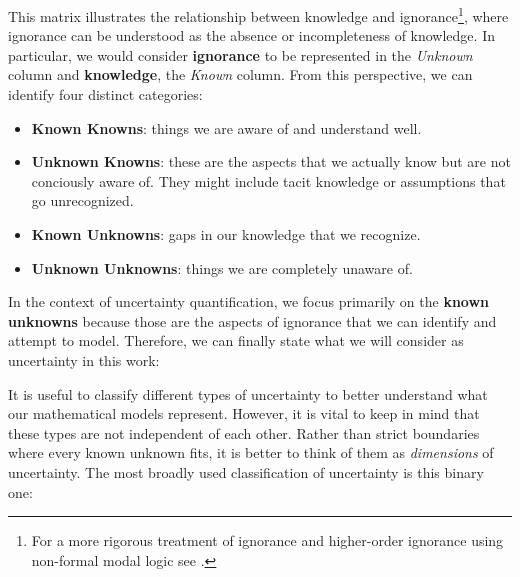 This matrix illustrates the relationship between knowledge and ignorance\footnote{For a more rigorous treatment of ignorance and higher-order ignorance using non-formal modal logic see \cite{firstorderignorance}.}, where ignorance can be understood as the absence or incompleteness of knowledge. In particular, we would consider \textbf{ignorance} to be represented in the \textit{Unknown} column and \textbf{knowledge}, the \textit{Known} column. From this perspective, we can identify four distinct categories:
\begin{itemize}
    \item \textbf{Known Knowns}: things we are aware of and understand well.
    \item \textbf{Unknown Knowns}: these are the aspects that we actually know but are not conciously aware of. They might include tacit knowledge or assumptions that go unrecognized.
    \item \textbf{Known Unknowns}: gaps in our knowledge that we recognize.
    \item \textbf{Unknown Unknowns}: things we are completely unaware of.
\end{itemize}

In the context of uncertainty quantification, we focus primarily on the \textbf{known unknowns} because those are the aspects of ignorance that we can identify and attempt to model. Therefore, we can finally state what we will consider as uncertainty in this work:\\


\begin{definition}
    \cite{UncertaintySciences}
\end{definition}

It is useful to classify different types of uncertainty to better understand what our mathematical models represent. However, it is vital to keep in mind that these types are not independent of each other. Rather than strict boundaries where every known unknown fits, it is better to think of them as \textit{dimensions} of uncertainty. The most broadly used classification of uncertainty is this binary one:\\

